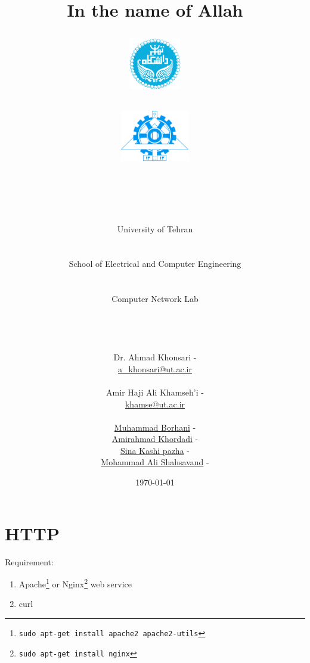 \documentclass[10pt,a4paper]{article}
\title{
\normalsize In the name of Allah\\
\vspace{10pt}
\LARGE\FR{بسم \allah\  الرحمن الرحیم}
\vspace{10pt}
\begin{center}
    \begin{minipage}{0.48\textwidth}
        \begin{flushleft}
            \includegraphics[height=64pt,width=64pt]{../img/logo.png}
        \end{flushleft}
    \end{minipage}
    \begin{minipage}{0.48\textwidth}
        \begin{flushright}
            \includegraphics[height=64pt]{../img/eng-logo.png}
        \end{flushright}
    \end{minipage}
\end{center}
\vspace*{-64pt}
\huge \titleText\\
\vspace{40pt}
}
\author{
    \huge University of Tehran\\
    \LARGE \FR{دانشگاه تهران}\\\\
    \LARGE School of Electrical and Computer Engineering\\
    \FR{دانشکده مهندسی برق و کامپیوتر}\\\\
    \Large Computer Network Lab\\
    \FR{آزمایشگاه شبکه‌های کامپیوتری}\\\\\\\\
    \normalfont
    Dr. Ahmad Khonsari - \FR{احمد خونساری}\\
    \href{mailto:a_khonsari@ut.ac.ir}{a\_khonsari@ut.ac.ir}\\\\
    \normalsize
    Amir Haji Ali Khamseh'i - \FR{امیر حاجی علی خمسه‌ء}\\
    \href{mailto:khamse@ut.ac.ir}{khamse@ut.ac.ir}\\\\
    \normalsize \href{mailto:m.borhani@ut.ac.ir}{Muhammad Borhani} - \FR{محمد برهانی}\\
	\normalsize \href{mailto:a.a.khordadi@ut.ac.ir}{Amirahmad Khordadi} - \FR{امیر احمد خردادی}\\
	\normalsize \href{mailto:sina\_kashipazha@ut.ac.ir}{Sina Kashi pazha} - \FR{سینا کاشی پزها}\\
	\normalsize \href{mailto:mashahsavand@ut.ac.ir}{Mohammad Ali Shahsavand} - \FR{محمد علی شاهسوند}
}
\date{\vspace{30pt}\today\\\vspace{10pt}{\selectlanguage{farsi}\today}}
\numberwithin{equation}{section}
\numberwithin{figure}{section}
\numberwithin{table}{section}
\begin{document}

    \maketitle


    \pagebreak




    \section*{HTTP}
    Requirement:
    \begin{enumerate}
        \item Apache\footnote{\texttt{sudo apt-get install apache2 apache2-utils}} or Nginx\footnote{\texttt{sudo apt-get install nginx}} web service
        \item curl
    \end{enumerate}
\end{document}
